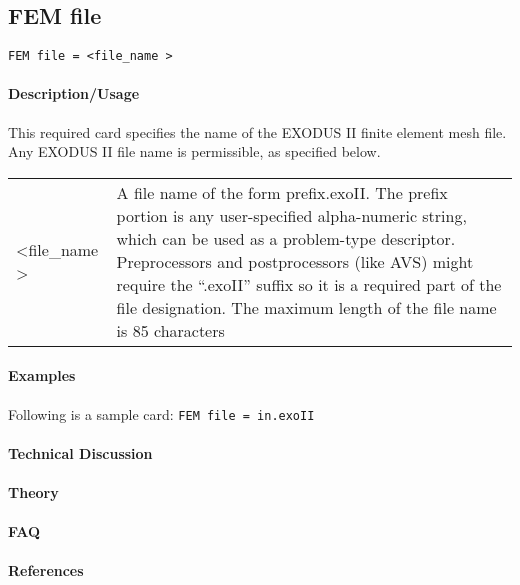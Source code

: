 \subsection{FEM file}
%
\shadowbox %
{
\parbox{\mylength}{
\setlength{\abovedisplayskip}{0pt}
\setlength{\belowdisplayskip}{0pt}
\texttt{FEM file =  \textless file\_name \textgreater}	
}}
%
\paragraph{Description/Usage}
%
This required card specifies the name of the EXODUS II finite element mesh file. Any EXODUS II file name is permissible, as specified below.
%
\begin{center}
	\begin{tabular}{ l p{10cm} }
		\textless file\_name \textgreater & A file name of the form prefix.exoII. The prefix portion is any user-specified alpha-numeric string, which can be used as a problem-type descriptor. Preprocessors and postprocessors (like AVS) might require the “.exoII” suffix so it is a required part of the file designation. The maximum length of the file name is 85 characters
	\end{tabular}
\end{center}
%
\paragraph{Examples}
%
Following is a sample card:
%
\texttt{FEM file = in.exoII}
%
\paragraph{Technical Discussion}
%
\paragraph{Theory}
%
\paragraph{FAQ}
%
\paragraph{References}
